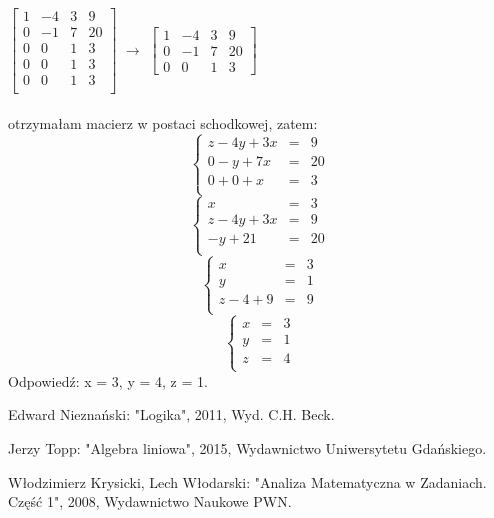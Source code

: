 \documentclass[10pt]{mwart}
\theoremstyle{plain} \newtheorem{tw}{Twierdzenie}[section]
\theoremstyle{plain} \newtheorem{lem}[tw]{Lemat}
\theoremstyle{definition} \newtheorem{df}[tw]{Definicja}
\begin{document}
\(\begin{bmatrix}
1&-4&3&9\\
0&-1&7&20\\
0&0&1&3\\
0&0&1&3\\
0&0&1&3\\
\end{bmatrix}\) \(\to\)
\(\begin{bmatrix}
1&-4&3&9\\
0&-1&7&20\\
0&0&1&3
\end{bmatrix}\)
\\ \\ otrzymałam macierz w postaci schodkowej, zatem:
$$\left\{\begin{array}{rcl}
z - 4y +3x&=&9\\
0 - y + 7x&=&20\\
0 + 0 + x&=&3\\
\end{array} \right.$$
$$\left\{\begin{array}{rcl}
x&=&3\\
z - 4y +3x&=&9\\
- y + 21&=&20\\
\end{array} \right.$$
$$\left\{\begin{array}{rcl}
x&=&3\\
y&=&1\\
z - 4 +9&=&9\\
\end{array} \right.$$
$$\left\{\begin{array}{rcl}
x&=&3\\
y&=&1\\
z&=&4\\
\end{array} \right.$$
Odpowiedź: x = 3, y = 4, z = 1.
\begin{thebibliography}{1293}
    \hypertarget{odnośnik1}{ 
Edward Nieznański: "Logika", 2011, Wyd. C.H. Beck.}
     \hypertarget{odnośnik2}{ Jerzy Topp: "Algebra liniowa", 2015, Wydawnictwo Uniwersytetu Gdańskiego.}
     \hypertarget{odnośnik3}{ Włodzimierz Krysicki, Lech Włodarski: "Analiza Matematyczna w Zadaniach. Część 1", 2008, Wydawnictwo Naukowe PWN.}
\end{thebibliography}
\end{document}

